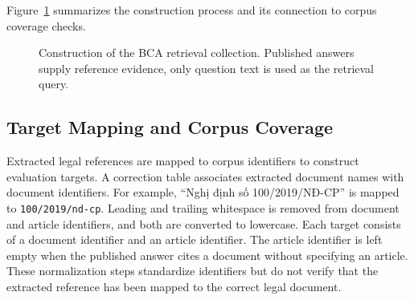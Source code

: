 Figure~\ref{fig:4.2} summarizes the construction process and its connection to corpus coverage checks.

\begin{figure}[htbp]
\centering
{}
\caption[Construction of the BCA retrieval collection.]{Construction of the BCA retrieval collection. Published answers supply reference evidence, only question text is used as the retrieval query.}
\label{fig:4.2}
\end{figure}

\subsection{Target Mapping and Corpus Coverage}
\label{sec:bca-target-mapping}

Extracted legal references are mapped to corpus identifiers to construct evaluation targets. A correction table associates extracted document names with document identifiers. For example, ``Nghị định số 100/2019/NĐ-CP'' is mapped to \texttt{100/2019/nd-cp}. Leading and trailing whitespace is removed from document and article identifiers, and both are converted to lowercase. Each target consists of a document identifier and an article identifier. The article identifier is left empty when the published answer cites a document without specifying an article. These normalization steps standardize identifiers but do not verify that the extracted reference has been mapped to the correct legal document.

